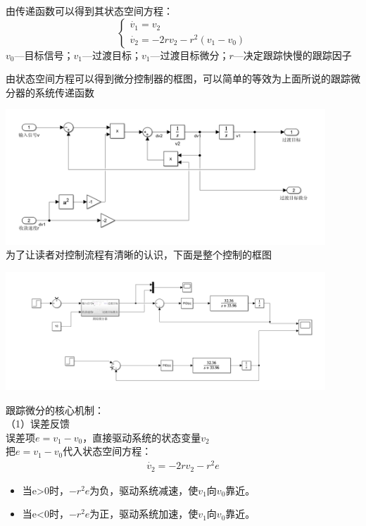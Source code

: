 \documentclass[UTF8,a4paper,12pt]{ctexart}
\begin{document}
            
              由传递函数可以得到其状态空间方程：
            $$ 
            \begin{cases}
              \overset{\cdot}{v}_1=v_2\\
              \overset{\cdot}{v}_2=-2rv_2-r^2\left( v_1-v_0 \right) 
            \end{cases}$$
            $v_0$---目标信号；$v_1$---过渡目标；$v_1$---过渡目标微分；$r$---决定跟踪快慢的跟踪因子
            \begin{flushleft}
              由状态空间方程可以得到微分控制器的框图，可以简单的等效为上面所说的跟踪微分器的系统传递函数
              \par \includegraphics[width=12cm]{picture/tracking_differentiator_ss.png}\\
              为了让读者对控制流程有清晰的认识，下面是整个控制的框图
              \par \includegraphics[width=12cm]{picture/tracking_differentiator_ss_all.png}\\
              \end{flushleft}
              跟踪微分的核心机制：\\
              （1）误差反馈\\
              误差项$e=v_1-v_0$，直接驱动系统的状态变量$v_2$\\
              把$e=v_1-v_0$代入状态空间方程：
              \begin{align*}
                \overset{\cdot}{v}_2=-2rv_2-r^2e
              \end{align*}
              \begin{itemize} 
                \item 当e>0时，$-r^2e$为负，驱动系统减速，使$v_1$向$v_0$靠近。
                \item 当e<0时，$-r^2e$为正，驱动系统加速，使$v_1$向$v_0$靠近。
              \end{itemize}
\end{document}
